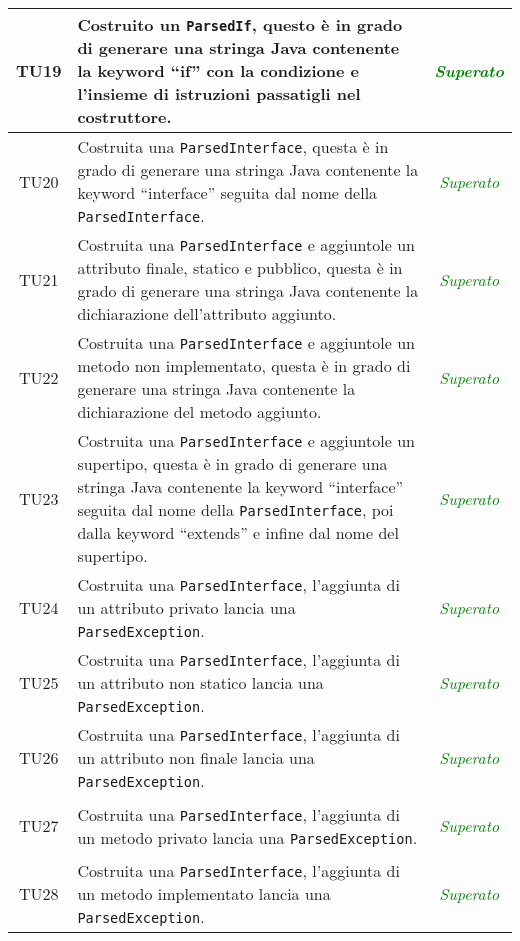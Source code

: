 \begin{longtable}{|c|>{}m{8cm}|c|}
\hypertarget{TU19}{TU19} & Costruito un \texttt{ParsedIf}, questo è in grado di generare una stringa Java contenente la keyword ``if'' con la condizione e l'insieme di istruzioni passatigli nel costruttore. & \textcolor{Green}{\textit{Superato}}\\ \hline
\hypertarget{TU20}{TU20} & Costruita una \texttt{ParsedInterface}, questa è in grado di generare una stringa Java contenente la keyword ``interface'' seguita dal nome della \texttt{ParsedInterface}. & \textcolor{Green}{\textit{Superato}}\\ \hline
\hypertarget{TU21}{TU21} & Costruita una \texttt{ParsedInterface} e aggiuntole un attributo finale, statico e pubblico, questa è in grado di generare una stringa Java contenente la dichiarazione dell'attributo aggiunto. & \textcolor{Green}{\textit{Superato}}\\ \hline
\hypertarget{TU22}{TU22} & Costruita una \texttt{ParsedInterface} e aggiuntole un metodo non implementato, questa è in grado di generare una stringa Java contenente la dichiarazione del metodo aggiunto. & \textcolor{Green}{\textit{Superato}}\\ \hline
\hypertarget{TU23}{TU23} & Costruita una \texttt{ParsedInterface} e aggiuntole un supertipo, questa è in grado di generare una stringa Java contenente la keyword ``interface'' seguita dal nome della \texttt{ParsedInterface}, poi dalla keyword ``extends'' e infine dal nome del supertipo. & \textcolor{Green}{\textit{Superato}}\\ \hline
\hypertarget{TU24}{TU24} & Costruita una \texttt{ParsedInterface}, l'aggiunta di un attributo privato lancia una \texttt{ParsedException}. & \textcolor{Green}{\textit{Superato}}\\ \hline
\hypertarget{TU25}{TU25} & Costruita una \texttt{ParsedInterface}, l'aggiunta di un attributo non statico lancia una \texttt{ParsedException}. & \textcolor{Green}{\textit{Superato}}\\ \hline
\hypertarget{TU26}{TU26} & Costruita una \texttt{ParsedInterface}, l'aggiunta di un attributo non finale lancia una \texttt{ParsedException}. & \textcolor{Green}{\textit{Superato}}\\ \hline
\hypertarget{TU27}{TU27} & Costruita una \texttt{ParsedInterface}, l'aggiunta di un metodo privato lancia una \texttt{ParsedException}. & \textcolor{Green}{\textit{Superato}}\\ \hline
\hypertarget{TU28}{TU28} & Costruita una \texttt{ParsedInterface}, l'aggiunta di un metodo implementato lancia una \texttt{ParsedException}. & \textcolor{Green}{\textit{Superato}}\\ \hline

\end{longtable}
